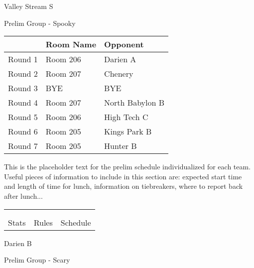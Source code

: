 \documentclass{article}%
\begin{document}
\newpage%
%
\begin{center}%
\begin{Huge}%
Valley Stream S%
\end{Huge}%
\vspace*{12pt}%
\linebreak%
\begin{Large}%
Prelim Group {-} Spooky%
\end{Large}%
\end{center}%
\vspace*{4pt}%
\begin{tabularx}{\textwidth}{|c|Y|Y|}%
\hline%
&Room Name&Opponent\\%
\hline%
Round 1&Room 206&Darien A\\%
Round 2&Room 207&Chenery\\%
Round 3&BYE&BYE\\%
Round 4&Room 207&North Babylon B\\%
Round 5&Room 206&High Tech C\\%
Round 6&Room 205&Kings Park B\\%
Round 7&Room 205&Hunter B\\%
\hline%
\end{tabularx}%
\vspace*{30pt}%
\linebreak%
This is the placeholder text for the prelim schedule individualized for each team. Useful pieces of information to include in this section are: expected start time and length of time for lunch, information on tiebreakers, where to report back after lunch...%
\vspace*{30pt}%
\newline%
%
\begin{tabularx}{\textwidth}{YYY}%
  &  &  \\%
\\%
Stats&Rules&Schedule\\%
\end{tabularx}%
\newpage%
%
\begin{center}%
\begin{Huge}%
Darien B%
\end{Huge}%
\vspace*{12pt}%
\linebreak%
\begin{Large}%
Prelim Group {-} Scary%
\end{Large}%
\end{center}%
\end{document}
